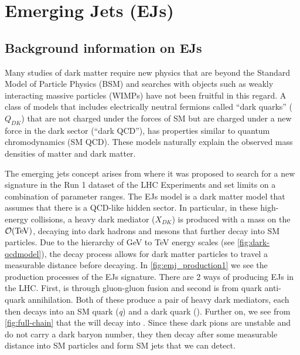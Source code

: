 \chapter{Emerging Jets (EJs) \label{ch:emj}}


\section{Background information on EJs}

Many studies of dark matter require new physics that are beyond the Standard Model of Particle Physics (BSM) and searches with objects such as weakly interacting massive particles (WIMPs) have not been fruitful in this regard.
A class of models that includes electrically neutral fermions called “dark quarks” ($Q_{DK}$) that are not charged under the forces of SM but are charged under a new force in the dark sector (``dark QCD''), has properties similar to quantum chromodynamics (SM QCD).
These models naturally explain the observed mass densities of matter and dark matter.

The emerging jets concept arises from \cite{Schwaller:2015gea} where it was proposed to search for a new signature in the Run 1 dataset of the LHC Experiments and set limits on a combination of parameter ranges. The EJs model is a dark matter model that assumes that there is a QCD-like hidden sector. In particular, in these high-energy collisions, a heavy dark mediator ($X_{DK}$) is produced with a mass on the $\order{\text{TeV}}$, decaying into dark hadrons and mesons that further decay into SM particles.
Due to the hierarchy of GeV to TeV energy scales (see \cref{fig:dark-qcdmodel}), the decay process allows for dark matter particles to travel a measurable distance before decaying.
In \cref{fig:emj_production1} we see the production processes of the EJs signature. There are 2 ways of producing EJs in the LHC. First, is through gluon-gluon fusion and second is from quark anti-quark annihilation.
Both of these produce a pair of heavy dark mediators, each then decays into an SM quark (\textit{q}) and a dark quark (\Qdark).
Further on, we see from \cref{fig:full-chain} that the \Qdark will decay into \pidark.
Since these dark pions are unstable and do not carry a dark baryon number, they then decay after some measurable distance into SM particles\cite{Bai_2014} and form SM jets that we can detect.


